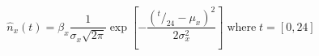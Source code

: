 \begin{equation}
\hat{n}_x(t) = \beta_x\frac{1}{\sigma_x\sqrt{2\pi}} \exp\left[-\frac{\left(^t/_{24}-\mu_x\right)^2}{2\sigma_x^2}\right] \;\text{where}\; t = [0, 24]
\end{equation}

